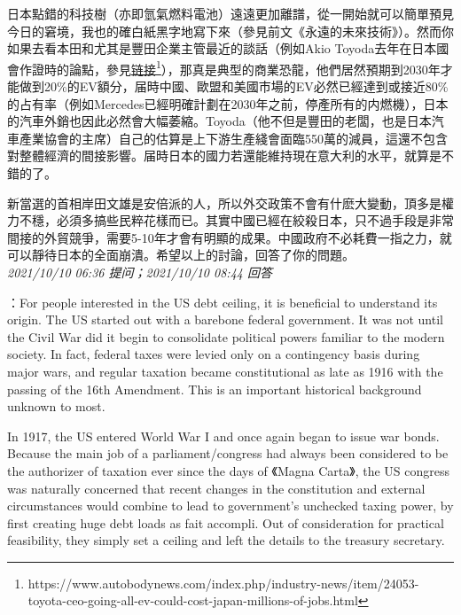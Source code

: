\documentclass[twocolumn]{ctexart}
\begin{document}
日本點錯的科技樹（亦即氫氣燃料電池）遠遠更加離譜，從一開始就可以簡單預見今日的窘境，我也的確白紙黑字地寫下來（參見前文《永遠的未來技術》）。然而你如果去看本田和尤其是豐田企業主管最近的談話（例如Akio Toyoda去年在日本國會作證時的論點，參見\href{https://www.autobodynews.com/index.php/industry-news/item/24053-toyota-ceo-going-all-ev-could-cost-japan-millions-of-jobs.html}{链接\footnote{\url{https://www.autobodynews.com/index.php/industry-news/item/24053-toyota-ceo-going-all-ev-could-cost-japan-millions-of-jobs.html}}}），那真是典型的商業恐龍，他們居然預期到2030年才能做到20\%的EV額分，届時中國、歐盟和美國市場的EV必然已經達到或接近80\%的占有率（例如Mercedes已經明確計劃在2030年之前，停產所有的内燃機），日本的汽車外銷也因此必然會大幅萎縮。Toyoda（他不但是豐田的老闆，也是日本汽車產業協會的主席）自己的估算是上下游生產綫會面臨550萬的減員，這還不包含對整體經濟的間接影響。届時日本的國力若還能維持現在意大利的水平，就算是不錯的了。

新當選的首相岸田文雄是安倍派的人，所以外交政策不會有什麽大變動，頂多是權力不穩，必須多搞些民粹花樣而已。其實中國已經在絞殺日本，只不過手段是非常間接的外貿競爭，需要5-10年才會有明顯的成果。中國政府不必耗費一指之力，就可以靜待日本的全面崩潰。希望以上的討論，回答了你的問題。
\\

\textit{\hfill\noindent\small 2021/10/10 06:36 提问；2021/10/10 08:44 回答}

：For people interested in the US debt ceiling, it is beneficial to understand its origin. The US started out with a barebone federal government. It was not until the Civil War did it begin to consolidate political powers familiar to the modern society. In fact, federal taxes were levied only on a contingency basis during major wars, and regular taxation became constitutional as late as 1916 with the passing of the 16th Amendment. This is an important historical background unknown to most.

In 1917, the US entered World War I and once again began to issue war bonds. Because the main job of a parliament/congress had always been considered to be the authorizer of taxation ever since the days of 《Magna Carta》, the US congress was naturally concerned that recent changes in the constitution and external circumstances would combine to lead to government's unchecked taxing power, by first creating huge debt loads as fait accompli. Out of consideration for practical feasibility, they simply set a ceiling and left the details to the treasury secretary.
\end{document}

